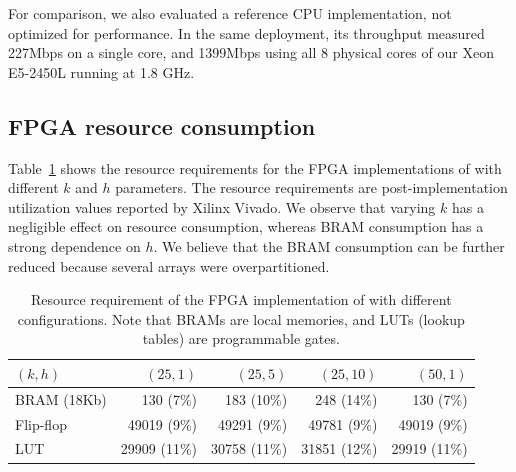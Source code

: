 For comparison, we also evaluated a reference CPU implementation, not 
optimized for performance. In the same deployment, its throughput 
measured 227Mbps on a single core, and 1399Mbps using all 8 physical cores of
our Xeon E5-2450L running at 1.8 GHz.




\subsection{FPGA resource consumption}
Table~\ref{tab:microbenchmarks} shows the resource requirements for the FPGA implementations of
\OurSys with different $k$ and $h$ parameters.  The resource requirements are
post-implementation utilization values reported by Xilinx Vivado.  We observe
that varying $k$ has a negligible effect on resource consumption, whereas BRAM
consumption has a strong dependence on $h$.  We believe that the BRAM consumption
can be further reduced because several arrays were overpartitioned.

\begin{table}
\begin{center}
\small
\begin{tabular}{ l r r r r } 
\toprule
$(k, h)$ & $(25, 1)$ & $(25, 5)$ & $(25,10)$ & $(50, 1)$ \\
\midrule
BRAM (18Kb) & 130 (7\%) & 183 (10\%) & 248 (14\%) & 130 (7\%) \\
Flip-flop & 49019 (9\%) & 49291 (9\%) & 49781 (9\%) & 49019 (9\%) \\
LUT & 29909 (11\%) & 30758 (11\%) & 31851 (12\%) & 29919 (11\%) \\
\bottomrule
\end{tabular}
\caption{Resource requirement %
of the FPGA %
implementation of \OurSys with different configurations.  Note that BRAMs are local memories,
and LUTs (lookup tables) are programmable gates.} %
\label{tab:microbenchmarks}
\end{center}
\end{table}

